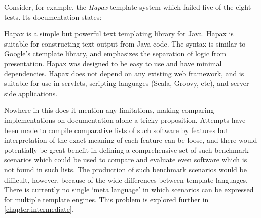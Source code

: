 Consider, for example, the \emph{Hapax} template system which failed five of the eight tests. Its documentation states:

\begin{displayquote}
Hapax is a simple but powerful text templating library for Java. Hapax is suitable for constructing text output from Java code. The syntax is similar to Google's ctemplate library, and emphasizes the separation of logic from presentation. Hapax was designed to be easy to use and have minimal dependencies. Hapax does not depend on any existing web framework, and is suitable for use in servlets, scripting languages (Scala, Groovy, etc), and server-side applications.
\end{displayquote}

Nowhere in this does it mention any limitations, making comparing implementations on documentation alone a tricky proposition. Attempts have been made to compile comparative lists of such software by features \citep{Wikipedia2018} but interpretation of the exact meaning of each feature can be loose, and there would potentially be great benefit in defining a comprehensive set of such benchmark scenarios which could be used to compare and evaluate even software which is not found in such lists. The production of such benchmark scenarios would be difficult, however, because of the wide differences between template languages. There is currently no single `meta language' in which scenarios can be expressed for multiple template engines. This problem is explored further in \autoref{chapter:intermediate}.

